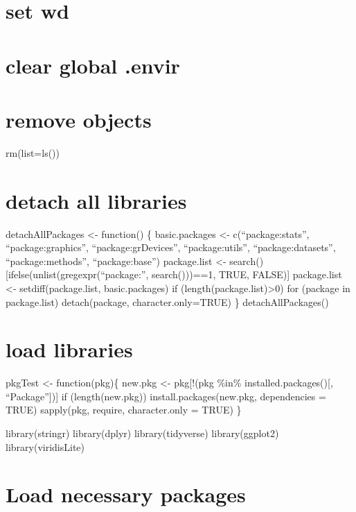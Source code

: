 \documentclass[
]{article}
\begin{document}
\hypertarget{set-wd}{%
\section{set wd}\label{set-wd}}

\hypertarget{clear-global-.envir}{%
\section{clear global .envir}\label{clear-global-.envir}}

\hypertarget{remove-objects}{%
\section{remove objects}\label{remove-objects}}

rm(list=ls())

\hypertarget{detach-all-libraries}{%
\section{detach all libraries}\label{detach-all-libraries}}

detachAllPackages \textless- function() \{ basic.packages \textless-
c(``package:stats'', ``package:graphics'', ``package:grDevices'',
``package:utils'', ``package:datasets'', ``package:methods'',
``package:base'') package.list \textless-
search(){[}ifelse(unlist(gregexpr(``package:'', search()))==1, TRUE,
FALSE){]} package.list \textless- setdiff(package.list, basic.packages)
if (length(package.list)\textgreater0) for (package in package.list)
detach(package, character.only=TRUE) \} detachAllPackages()

\hypertarget{load-libraries-1}{%
\section{load libraries}\label{load-libraries-1}}

pkgTest \textless- function(pkg)\{ new.pkg \textless- pkg{[}!(pkg \%in\%
installed.packages(){[}, ``Package''{]}){]} if (length(new.pkg))
install.packages(new.pkg, dependencies = TRUE) sapply(pkg, require,
character.only = TRUE) \}

library(stringr) library(dplyr) library(tidyverse) library(ggplot2)
library(viridisLite)

\hypertarget{load-necessary-packages}{%
\section{Load necessary packages}\label{load-necessary-packages}}
\end{document}

